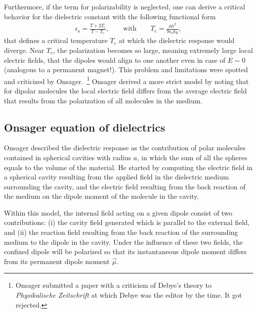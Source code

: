 Furthermore, if the term for polarizability is neglected, one can derive a critical behavior for the dielectric constant with the following functional form
\begin{eqnarray}
\epsilon_\text{s} = \frac{T + 2 T_c}{T - T_c}, \qquad \text{with} \qquad T_c = \frac{\rho \mu^2}{9 \epsilon_0 k_\text{B}},
\label{DebyeCritical}
\end{eqnarray} 
that defines a critical temperature $T_c$ at which the dielectric response would diverge. Near $T_c$, the polarization becomes so large, meaning extremely large local electric fields, that the dipoles would align to one another even in case of $E \sim 0$ (analogous to a permanent magnet!). This problem and limitations were spotted and criticized by Onsager.~\footnote{Onsager submitted a paper with a criticism of Debye's theory to \textit{Physikalische Zeitschrift} at which Debye was the editor by the time. It got rejected.\!\cite{ChristopherLonguet-Higgins1995}} Onsager derived a more strict model by noting that for dipolar molecules the local electric field differs from the average electric field that results from the polarization of all molecules in the medium.



\subsection{Onsager equation of dielectrics}



Onsager described the dielectric response as the contribution of polar molecules contained in spherical cavities with radius $a$, in which the sum of all the spheres equals to the volume of the material.\!\cite{Onsager1936,BOTTCHER1973} He started by computing the electric field in a spherical cavity resulting from the applied field in the dielectric medium surrounding the cavity, and the electric field resulting from the back reaction of the medium on the dipole moment of the molecule in the cavity.





Within this model, the internal field acting on a given dipole consist of two contributions: (i) the cavity field generated which is parallel to the external field, and (ii) the reaction field resulting from the back reaction of the surrounding medium to the dipole in the cavity. Under the influence of these two fields, the confined dipole will be polarized so that its instantaneous dipole moment differs from its permanent dipole moment $\vec{\mu}$.\!\cite{Wilson1939}



